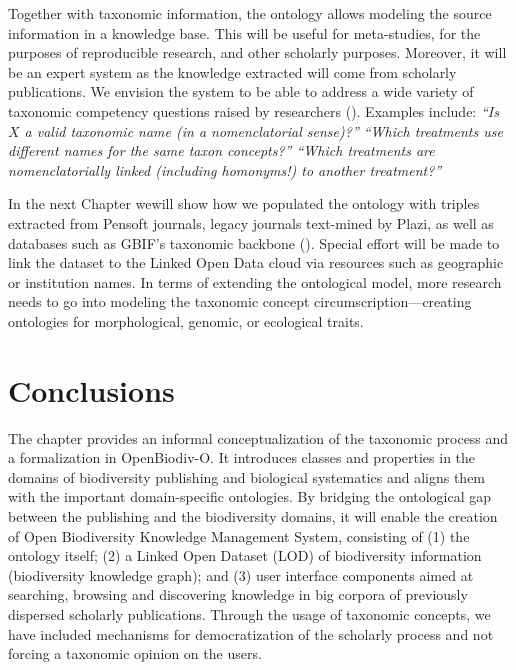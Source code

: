 Together with taxonomic information, the ontology allows modeling the source information in a knowledge base. This will be useful for meta-studies, for the purposes of reproducible research, and other scholarly purposes. Moreover, it will be an expert system as the knowledge extracted will come from scholarly publications. We envision the system to be able to address a wide variety of taxonomic competency questions raised by researchers (\cite{pro-ibiosphere_competency_2013}). Examples include: \emph{``Is $X$ a valid taxonomic name (in a nomenclatorial sense)?'' ``Which treatments use different names for the same taxon concepts?'' ``Which treatments are nomenclatorially linked (including homonyms!) to another treatment?''}

In the next Chapter wewill show how we populated the ontology with triples extracted from Pensoft journals, legacy journals text-mined by Plazi, as well as databases such as GBIF's taxonomic backbone (\cite{gbif_secretariat_gbif_2017}). Special effort will be made to link the dataset to the Linked Open Data cloud via resources such as geographic or institution names. In terms of extending the ontological model, more research needs to go into modeling the taxonomic concept circumscription---creating ontologies for morphological, genomic, or ecological traits. 

\section{Conclusions}

The chapter provides an informal conceptualization of the taxonomic process and a formalization in \mbox{OpenBiodiv-O}. It introduces classes and properties in the domains of biodiversity publishing and biological systematics and aligns them with the important domain-specific ontologies. By bridging the ontological gap between the publishing and the biodiversity domains, it will enable the creation of Open Biodiversity Knowledge Management System, consisting of (1) the ontology itself; (2) a Linked Open Dataset (LOD) of biodiversity information (biodiversity knowledge graph); and (3) user interface components aimed at searching, browsing and discovering knowledge in big corpora of previously dispersed scholarly publications. Through the usage of taxonomic concepts, we have included mechanisms for democratization of the scholarly process and not forcing a taxonomic opinion on the users.